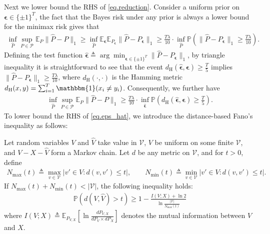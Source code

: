 \documentclass[final,12pt]{colt2018} %
\def \bP {\mathbb{P}}
\def \bE {\mathbb{E}}
\newcommand{\calP}{{\mathcal{P}}}
\newcommand{\calV}{{\mathcal{V}}}
\begin{document}
Next we lower bound the RHS of \eqref{eq.reduction}. Consider a uniform prior on $\bm{\epsilon}\in \{\pm 1\}^T$, the fact that the Bayes risk under any prior is always a lower bound for the minimax risk gives that
\begin{align*}
\inf_{\hat{P}}\sup_{P\in \calP} \bE_P\|\hat{P}-P\|_1 \ge \inf_{\hat{P}}\bE_{\bm{\epsilon}} \bE_{P_{\bm{\epsilon}}}\|\hat{P}-P_{\bm{\epsilon}}\|_1 \ge \frac{T\lambda}{10}\cdot \inf_{\hat{P}} \bP\left(\|\hat{P}-P_{\bm{\epsilon}}\|_1\ge \frac{T\lambda}{10}\right).
\end{align*}
Defining the test function $\hat{\bm{\epsilon}}\triangleq\arg\min_{\bm{\epsilon}\in \{\pm 1\}^T} \|\hat{P}-P_{\bm{\epsilon} }\|_1$, by triangle inequality it is straightforward to see that the event $d_{\text{H}}(\hat{\bm{\epsilon}},\bm{\epsilon})\ge \frac{T}{5}$ implies $\|\hat{P}-P_{\bm{\epsilon}}\|_1\ge \frac{T\lambda}{10}$, where $d_{\text{H}}(\cdot,\cdot)$ is the Hamming metric $d_{\text{H}}(x,y)=\sum_{i=1}^T \mathbbm{1}(x_i\neq y_i)$. Consequently, we further have
\begin{align}\label{eq.eps_hat}
\inf_{\hat{P}}\sup_{P\in \calP} \bE_P\|\hat{P}-P\|_1 \ge \frac{T\lambda}{10}\cdot \inf_{\hat{\bm{\epsilon}}}\bP\left(d_{\text{H}}(\hat{\bm{\epsilon}},\bm{\epsilon})\ge \frac{T}{5}\right).
\end{align}
To lower bound the RHS of \eqref{eq.eps_hat}, we introduce the distance-based Fano's inequality as follows:
\begin{lemma}\cite[Corollary 1]{duchi2013distance}\label{lemma.fano}
	Let random variables $V$ and $\hat{V}$ take value in $\calV$, $V$ be uniform on some finite $\calV$, and $V-X-\hat{V}$ form a Markov chain. Let $d$ be any metric on $\calV$, and for $t>0$, define
	\begin{align*}
	N_{\max}(t) \triangleq \max_{v\in \calV} |v'\in V: d(v,v')\le t|, \qquad N_{\min}(t) \triangleq \min_{v\in \calV} |v'\in V: d(v,v')\le t|.
	\end{align*}
	If $N_{\max}(t)+N_{\min}(t)<|\calV|$, the following inequality holds:
	\begin{align*}
	\bP(d(V,\hat{V})>t) \ge 1 - \frac{I(V;X)+\ln 2}{\ln\frac{|\calV|}{N_{\max}(t)}}
	\end{align*}
	where $I(V;X)\triangleq \bE_{P_{V,X}}\left[\ln \frac{dP_{V,X}}{dP_V\times dP_X}\right]$ denotes the mutual information between $V$ and $X$.
\end{lemma}
\end{document}
